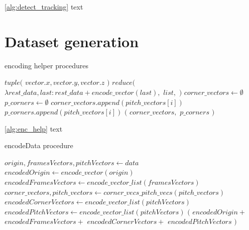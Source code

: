 \documentclass[
    11pt,
    twoside
]{report}
\begin{document}
\ref{alg:detect_tracking} text





\section{Dataset generation}


\begin{algorithm}[H]
\begin{algorithmic}
\caption{encoding helper procedures}\label{alg:enc_help}
    \Return $tuple($
        \State \indent $vector.x, vector.y, vector.z$
    \State $)$
\EndProcedure
{}
    \Return $reduce($
        \State \indent $\lambda rest\_data, last: rest\_data + encode\_vector(last),$
        \State \indent $list,$
        \State \indent \emptyset {}
    \State $)$
\EndProcedure
{}
    \State $corner\_vectors \gets \emptyset$
    \State $p\_corners \gets \emptyset$
            \State $corner\_vectors.append(pitch\_vectors[i])$
        \Else
            \State $p\_corners.append(pitch\_vectors[i])$
        \EndIf
    \EndFor
    \State
    \Return $($
        \State \indent $corner\_vectors,$
        \State \indent $p\_corners$
    \State $)$
\EndProcedure
\end{algorithmic}
\end{algorithm}


\ref{alg:enc_help} text


\begin{algorithm}[H]
\begin{algorithmic}
\caption{encodeData procedure}\label{alg:enc_data}
    \State $origin, framesVectors, pitchVectors \gets data$
    \State $encodedOrigin \gets encode\_vector(origin)$
    \State $encodedFramesVectors \gets encode\_vector\_list(framesVectors)$
    \State $corner\_vectors, pitch\_vectors \gets corner\_vecs\_pitch\_vecs(pitch\_vectors)$
    \State $encodedCornerVectors \gets encode\_vector\_list(pitchVectors)$
    \State $encodedPitchVectors \gets encode\_vector\_list(pitchVectors)$
    \State
    \Return $($
        \State \indent $encodedOrigin +$
        \State \indent $encodedFramesVectors +$
        \State \indent $encodedCornerVectors +$
        \State \indent $encodedPitchVectors$
    \State $)$
\EndProcedure
\end{algorithmic}
\end{algorithm}
\end{document}
